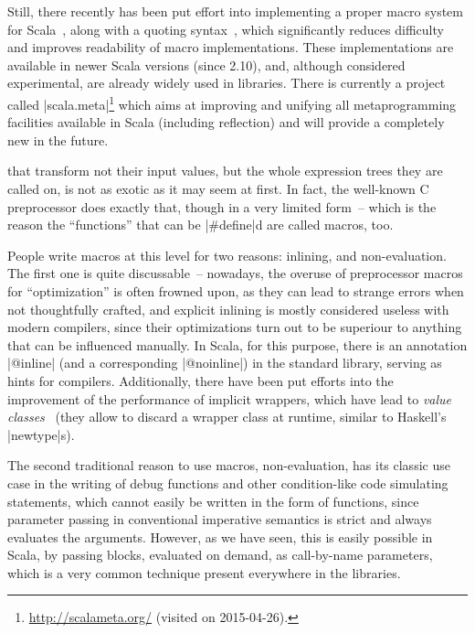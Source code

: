 Still, there recently has been put effort into implementing a proper macro system for
Scala~\cite{burmako2013:macros}, along with a quoting syntax~\cite{shabalin2013:quasiquotes}, which
significantly reduces difficulty and improves readability of macro implementations. These
implementations are available in newer Scala versions (since 2.10), and, although considered
experimental, are already widely used in libraries. There is currently a project called
|scala.meta|\footnote{\protect\url{http://scalameta.org/} (visited on 2015-04-26).} which aims at
improving and unifying all metaprogramming facilities available in Scala (including reflection) and
will provide a completely new  in the future.

 that transform not their input values, but the whole
expression trees they are called on, is not as exotic as it may seem at first. In fact, the
well-known C preprocessor does exactly that, though in a very limited form~-- which is the reason
the \enquote{functions} that can be |#define|d are called macros, too.

People write macros at this level for two reasons: inlining, and non-evaluation. The first one is
quite discussable~-- nowadays, the overuse of preprocessor macros for \enquote{optimization} is
often frowned upon, as they can lead to strange errors when not thoughtfully crafted, and explicit
inlining is mostly considered useless with modern compilers, since their optimizations turn out to
be superiour to anything that can be influenced manually. In Scala, for this purpose, there is an
annotation |@inline| (and a corresponding |@noinline|) in the standard library, serving as hints for
compilers. Additionally, there have been put efforts into the improvement of the performance of
implicit wrappers, which have lead to \emph{value classes}~\cite{odersky2012:value_classes} (they
allow to discard a wrapper class at runtime, similar to Haskell's |newtype|s).

The second traditional reason to use macros, non-evaluation, has its classic use case in the writing
of debug functions and other condition-like code simulating statements, which cannot easily be
written in the form of functions, since parameter passing in conventional imperative semantics is
strict and always evaluates the arguments. However, as we have seen, this is easily possible in
Scala, by passing blocks, evaluated on demand, as call-by-name parameters, which is a very common
technique present everywhere in the libraries.

